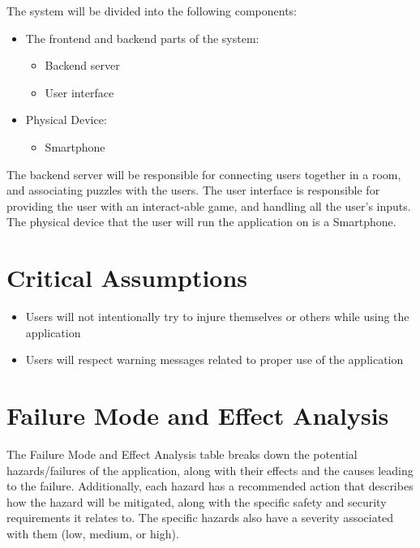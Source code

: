 \documentclass{article}
\begin{document}
The system will be divided into the following components:
\begin{itemize}
    \item The frontend and backend parts of the system:
    \begin{itemize}
        \item Backend server
        \item User interface
    \end{itemize}
    \item Physical Device:
        \begin{itemize}
            \item Smartphone
        \end{itemize}
\end{itemize}

The backend server will be responsible for connecting users together in a room, and associating puzzles with the users. The user interface is responsible for providing the user with an interact-able game, and handling all the user's inputs. The physical device that the user will run the application on is a Smartphone.

\section{Critical Assumptions}
\begin{itemize}
    \item Users will not intentionally try to injure themselves or others while using the application
    \item Users will respect warning messages related to proper use of the application
\end{itemize}


\section{Failure Mode and Effect Analysis}
The Failure Mode and Effect Analysis table breaks down the potential hazards/failures of the application, along with their effects and the causes leading to the failure. Additionally, each hazard has a recommended action that describes how the hazard will be mitigated, along with the specific safety and security requirements it relates to. The specific hazards also have a severity associated with them (low, medium, or high).
\end{document}
